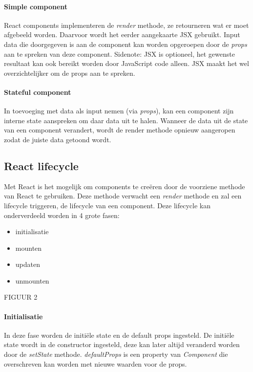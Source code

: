 \paragraph{Simple component}
React components implementeren de \textit{render} methode, ze retourneren wat er moet afgebeeld worden. Daarvoor wordt het eerder aangekaarte JSX gebruikt. Input data die doorgegeven is aan de component kan worden opgeroepen door de \textit{props} aan te spreken van deze component. Sidenote: JSX is optioneel, het gewenste resultaat kan ook bereikt worden door JavaScript code alleen. JSX maakt het wel overzichtelijker om de props aan te spreken.  
\autocite{React01}

\paragraph{Stateful component}
In toevoeging met data als input nemen (via \textit{props}), kan een component zijn interne state aanspreken om daar data uit te halen. Wanneer de data uit de state van een component verandert, wordt de render methode opnieuw aangeropen zodat de juiste data getoond wordt.
\autocite{React01}


\subsection{React lifecycle}
Met React is het mogelijk om components te creëren door de voorziene methode van React te gebruiken. Deze methode verwacht een \textit{render} methode en zal een lifecycle triggeren, de lifecycle van een component. 
Deze lifecycle kan onderverdeeld worden in 4 grote fasen:
\begin{itemize}
	\item initialisatie
	\item mounten
	\item updaten
	\item unmounten
\end{itemize}

FIGUUR 2

\paragraph{Initialisatie}
In deze fase worden de initiële state en de default props ingesteld. De initiële state wordt in de constructor ingesteld, deze kan later altijd veranderd worden door de \textit{setState} methode. \textit{defaultProps} is een property van \textit{Component} die overschreven kan worden met nieuwe waarden voor de props. 

